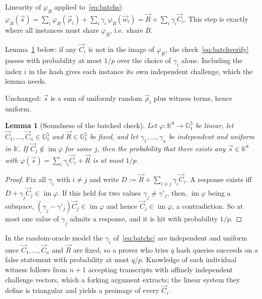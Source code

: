 \documentclass[10pt,a5paper]{article}
\newtheorem{lemma}{Lemma}
\newcommand{\K}[1]{#1}                      %
\newcommand{\Go}[1]{#1}                     %
\newcommand{\K}[1]{{\color{ScalarCol}#1}}   %
\newcommand{\Go}[1]{{\color{GoneCol}#1}}    %
\newcommand{\F}{\mathbb{K}}
\newcommand{\GG}[1]{\mathbb{G}_{#1}}
\newcommand{\vv}[1]{\vec{#1}}
\begin{document}
\begin{whybox}
\begin{description}[nosep,leftmargin=1.2em]
\item[Completeness.] Linearity of $\varphi_{\Go{B}}$ applied to~\eqref{eq:batchs}:
  $\varphi_{\Go{B}}(\vv{s}) = \sum_i \varphi_{\Go{B}}(\vv{\rho}_i) + \sum_i \K{\gamma_i}\,\varphi_{\Go{B}}(\vv{w}_i) = \vv{R} + \sum_i \K{\gamma_i}\vv{C}_i$.
  This step is exactly where all instances must share $\varphi_{\Go{B}}$, i.e.\
  share $\Go{B}$.
\item[Soundness.] Lemma~\ref{lem:batch} below: if any $\vv{C}_i$ is not in the
  image of $\varphi_{\Go{B}}$, the check~\eqref{eq:batchverify} passes with
  probability at most $1/p$ over the choice of $\K{\gamma_i}$ alone. Including
  the index $i$ in the hash gives each instance its own independent challenge,
  which the lemma needs.
\item[Zero knowledge.] Unchanged: $\vv{s}$ is a sum of uniformly random
  $\vv{\rho}_i$ plus witness terms, hence uniform.
\end{description}
\end{whybox}

\begin{lemma}[Soundness of the batched check]
\label{lem:batch}
Let $\varphi : \F^8 \to \GG{1}^5$ be linear, let $\vv{C}_1,\dots,\vv{C}_n \in \GG{1}^5$
and $\vv{R} \in \GG{1}^5$ be fixed, and let $\K{\gamma_1},\dots,\K{\gamma_n}$ be
independent and uniform in $\F$. If $\vv{C}_j \notin \operatorname{im}\varphi$ for
some $j$, then the probability that there exists any $\vv{s} \in \F^8$ with
$\varphi(\vv{s}) = \sum_i \K{\gamma_i}\vv{C}_i + \vv{R}$ is at most $1/p$.
\end{lemma}
\begin{proof}
Fix all $\K{\gamma_i}$ with $i \ne j$ and write
$\Go{D} := \vv{R} + \sum_{i \ne j} \K{\gamma_i}\vv{C}_i$. A response exists iff
$\Go{D} + \K{\gamma_j}\vv{C}_j \in \operatorname{im}\varphi$. If this held for two
values $\K{\gamma_j} \ne \K{\gamma'_j}$, then, $\operatorname{im}\varphi$ being a
subspace, $(\K{\gamma_j}-\K{\gamma'_j})\vv{C}_j \in \operatorname{im}\varphi$ and
hence $\vv{C}_j \in \operatorname{im}\varphi$, a contradiction. So at most one
value of $\K{\gamma_j}$ admits a response, and it is hit with probability
$1/p$.
\end{proof}

In the random-oracle model the $\K{\gamma_i}$ of~\eqref{eq:batchc} are
independent and uniform once $\vv{C}_1,\dots,\vv{C}_n$ and $\vv{R}$ are fixed,
so a prover who tries $q$ hash queries succeeds on a false statement with
probability at most $q/p$. Knowledge of each individual witness follows from
$n+1$ accepting transcripts with affinely independent challenge vectors, which
a forking argument extracts; the linear system they define is triangular and
yields a preimage of every $\vv{C}_i$.
\end{document}
